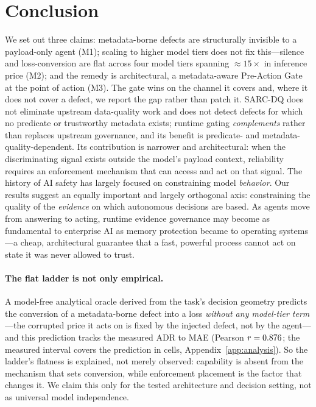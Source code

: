 \documentclass[11pt]{article}
\theoremstyle{plain}
\theoremstyle{definition}
\begin{document}
\section{Conclusion}
We set out three claims: metadata-borne defects are structurally invisible to a
payload-only agent (M1); scaling to higher model tiers does not fix this---silence and
loss-conversion are flat across four model tiers spanning $\approx15\times$ in inference
price (M2); and the remedy is architectural, a metadata-aware Pre-Action Gate at the point
of action (M3). The gate wins on the channel it covers and, where it does not cover a
defect, we report the gap rather than patch it. SARC-DQ does not eliminate upstream
data-quality work and does not detect defects for which no predicate or trustworthy
metadata exists; runtime gating \emph{complements} rather than replaces upstream governance,
and its benefit is predicate- and metadata-quality-dependent. Its contribution is narrower
and architectural: when the discriminating signal exists outside the model's payload
context, reliability requires an enforcement mechanism that can access and act on that
signal. The history of AI safety has largely focused on constraining model \emph{behavior}.
Our results suggest an equally important and largely orthogonal axis: constraining the
quality of the \emph{evidence} on which autonomous decisions are based. As agents move from
answering to acting, runtime evidence governance may become as fundamental to enterprise AI
as memory protection became to operating systems---a cheap, architectural guarantee that a
fast, powerful process cannot act on state it was never allowed to trust.

\paragraph{The flat ladder is not only empirical.} A model-free analytical oracle derived
from the task's decision geometry predicts the conversion of a metadata-borne defect into a
loss \emph{without any model-tier term}---the corrupted price it acts on is fixed by the
injected defect, not by the agent---and this prediction tracks the measured ADR to MAE
\ConvMAE{} (Pearson $r=0.876$; the measured interval covers the prediction in
\ConvCICoverage{} cells, Appendix~\ref{app:analysis}). So the ladder's flatness is explained,
not merely observed: capability is absent from the mechanism that sets conversion, while
enforcement placement is the factor that changes it. We claim this only for the tested
architecture and decision setting, not as universal model independence.
\end{document}
